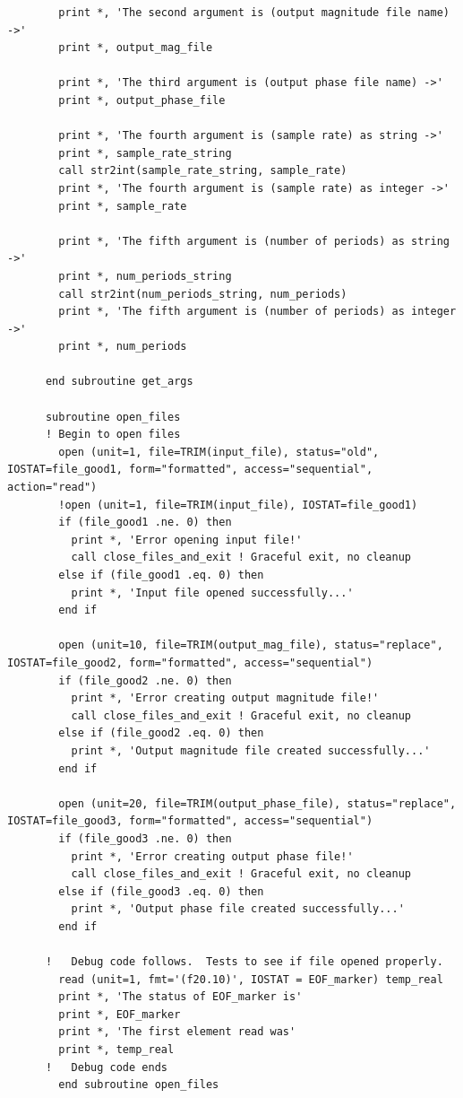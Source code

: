 \begin{verbatim}
        print *, 'The second argument is (output magnitude file name) ->'
        print *, output_mag_file
        
        print *, 'The third argument is (output phase file name) ->'
        print *, output_phase_file
        
        print *, 'The fourth argument is (sample rate) as string ->'
        print *, sample_rate_string
        call str2int(sample_rate_string, sample_rate)
        print *, 'The fourth argument is (sample rate) as integer ->'
        print *, sample_rate
        
        print *, 'The fifth argument is (number of periods) as string ->'
        print *, num_periods_string
        call str2int(num_periods_string, num_periods)
        print *, 'The fifth argument is (number of periods) as integer ->'
        print *, num_periods
        
      end subroutine get_args
    
      subroutine open_files
      ! Begin to open files
        open (unit=1, file=TRIM(input_file), status="old", IOSTAT=file_good1, form="formatted", access="sequential", action="read")
        !open (unit=1, file=TRIM(input_file), IOSTAT=file_good1)
        if (file_good1 .ne. 0) then
          print *, 'Error opening input file!'
          call close_files_and_exit	! Graceful exit, no cleanup  
        else if (file_good1 .eq. 0) then
          print *, 'Input file opened successfully...'
        end if
        
        open (unit=10, file=TRIM(output_mag_file), status="replace", IOSTAT=file_good2, form="formatted", access="sequential")
        if (file_good2 .ne. 0) then
          print *, 'Error creating output magnitude file!'
          call close_files_and_exit	! Graceful exit, no cleanup  
        else if (file_good2 .eq. 0) then
          print *, 'Output magnitude file created successfully...'
        end if
  
        open (unit=20, file=TRIM(output_phase_file), status="replace", IOSTAT=file_good3, form="formatted", access="sequential")
        if (file_good3 .ne. 0) then
          print *, 'Error creating output phase file!'
          call close_files_and_exit	! Graceful exit, no cleanup  
        else if (file_good3 .eq. 0) then
          print *, 'Output phase file created successfully...'
        end if
  
      !   Debug code follows.  Tests to see if file opened properly.
        read (unit=1, fmt='(f20.10)', IOSTAT = EOF_marker) temp_real
        print *, 'The status of EOF_marker is'
        print *, EOF_marker
        print *, 'The first element read was'
        print *, temp_real
      !   Debug code ends
        end subroutine open_files
      

\end{verbatim}
